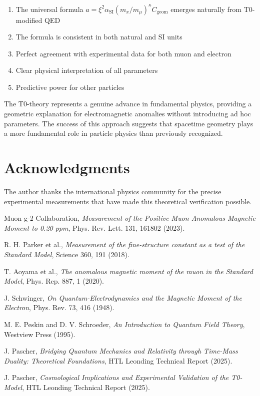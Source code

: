 \documentclass[12pt,a4paper]{article}
\newcommand{\xipar}{\xi}
\newcommand{\alphaSI}{\alpha_{\text{SI}}}
\newcommand{\Cgeom}{C_{\text{geom}}}
\newcommand{\kappaT}{\kappa}
\newcommand{\mmu}{m_{\mu}}
\begin{document}
	\begin{enumerate}
		\item The universal formula $a = \xipar^2 \alphaSI (m_x/\mmu)^{\kappaT} \Cgeom$ emerges naturally from T0-modified QED
		\item The formula is consistent in both natural and SI units
		\item Perfect agreement with experimental data for both muon and electron
		\item Clear physical interpretation of all parameters
		\item Predictive power for other particles
	\end{enumerate}
	
	The T0-theory represents a genuine advance in fundamental physics, providing a geometric explanation for electromagnetic anomalies without introducing ad hoc parameters. The success of this approach suggests that spacetime geometry plays a more fundamental role in particle physics than previously recognized.
	
	\section*{Acknowledgments}
	
	The author thanks the international physics community for the precise experimental measurements that have made this theoretical verification possible.
	
	\begin{thebibliography}{99}
		Muon g-2 Collaboration,
		\textit{Measurement of the Positive Muon Anomalous Magnetic Moment to 0.20 ppm},
		Phys. Rev. Lett. 131, 161802 (2023).
		
		R. H. Parker et al.,
		\textit{Measurement of the fine-structure constant as a test of the Standard Model},
		Science 360, 191 (2018).
		
		T. Aoyama et al.,
		\textit{The anomalous magnetic moment of the muon in the Standard Model},
		Phys. Rep. 887, 1 (2020).
		
		J. Schwinger,
		\textit{On Quantum-Electrodynamics and the Magnetic Moment of the Electron},
		Phys. Rev. 73, 416 (1948).
		
		M. E. Peskin and D. V. Schroeder,
		\textit{An Introduction to Quantum Field Theory},
		Westview Press (1995).
		
		J. Pascher,
		\textit{Bridging Quantum Mechanics and Relativity through Time-Mass Duality: Theoretical Foundations},
		HTL Leonding Technical Report (2025).
		
		J. Pascher,
		\textit{Cosmological Implications and Experimental Validation of the T0-Model},
		HTL Leonding Technical Report (2025).
	\end{thebibliography}
	
\end{document}
